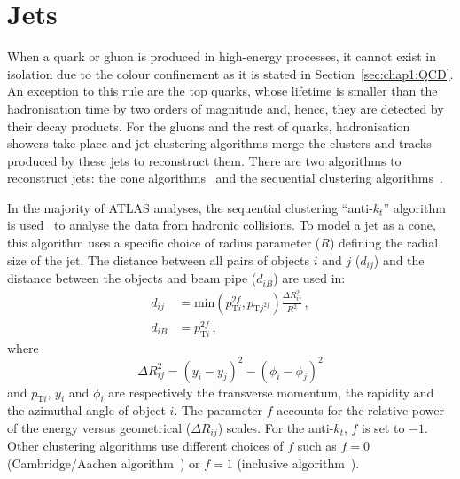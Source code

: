 \section{Jets}
\label{sec:Chap3:Reco:jets}
When a quark or gluon is produced in high-energy processes, it cannot exist in isolation due to 
the colour confinement as it is stated in Section~\ref{sec:chap1:QCD}.
An exception to this rule are the top quarks, whose lifetime is smaller than the hadronisation time by two orders of
magnitude and, hence, they are detected by their decay products. 
For the gluons and the rest of quarks, hadronisation showers %
take place and jet-clustering algorithms merge the clusters and tracks produced by these jets
to reconstruct them. There are two algorithms to reconstruct jets: the cone  %
algorithms~\cite{UA1:1983hhd} and the sequential clustering algorithms~\cite{Catani:1993hr}. 

In the majority of ATLAS analyses, the sequential clustering ``anti-$k_t$'' algorithm 
is used~\cite{Catani:1993hr, CMS-PAS-JME-09-001, Cacciari:2008gp} to analyse the data
from hadronic collisions. To model a jet as a cone, this algorithm uses a specific choice of radius parameter 
($R$) defining the radial size of the jet. 
The distance between all pairs of objects $i$ and $j$ ($d_{ij}$) and the distance between the 
objects and beam pipe ($d_{iB}$) are used in: 
\begin{align*}
	d_{ij} 	&= \text{min}(p^{2f}_{\text{T}i}, p_{\text{T}j^{2f}}) \frac{\Delta R_{ij}^{2}}{R^{2}}\, , \\ \label{eq:chap3:antikt_1}
	d_{iB} 	&= p^{2f}_{\text{T}i}\, ,
\end{align*}
where
\begin{equation*}
	\Delta R_{ij}^{2} = (y_{i} - y_{j})^{2} - (\phi_{i} - \phi_{j})^2
\end{equation*}
and $p_{\text{T}i}$, $y_i$ and $\phi_{i}$ are respectively the transverse momentum, the rapidity and
the azimuthal angle of object $i$. The parameter $f$ accounts for the relative power of the energy 
versus geometrical ($\Delta R_{ij}$) scales. 
For the anti-$k_t$, $f$ is set to $-1$. Other clustering algorithms
use different choices of $f$ such as $f=0$ (Cambridge/Aachen algorithm~\cite{CMS-PAS-JME-09-001}) or $f=1$ (inclusive \pT 
algorithm~\cite{Catani:1993hr}). 

